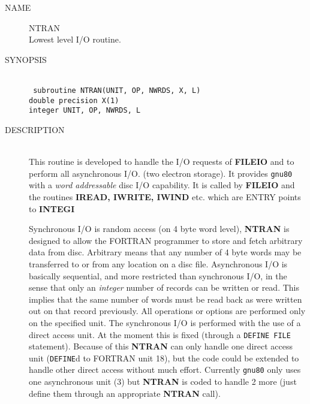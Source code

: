 \newpage
\begin{description}
\item[NAME] NTRAN \\
Lowest level I/O routine.
\item[SYNOPSIS] \ \\
{\tt
   subroutine NTRAN(UNIT, OP, NWRDS, X, L) \\
   double precision X(1) \\
   integer UNIT, OP, NWRDS, L \\
}
\item[DESCRIPTION] \ \\
This routine is developed to handle the I/O requests of {\bf FILEIO} and
to perform all asynchronous I/O. (two electron storage).  It provides
{\tt gnu80} with a {\em word addressable} disc I/O capability.  It is called
by {\bf FILEIO} and the routines {\bf IREAD, IWRITE, IWIND} etc. 
which are ENTRY points to {\bf INTEGI}

\begin{center}
\end{center}

Synchronous I/O is random access (on 4 byte word level),
{\bf NTRAN} is designed to allow the FORTRAN programmer to store and
fetch arbitrary data from disc.  Arbitrary means that any 
number of 4 byte words may be transferred to or from any location
on a disc file.
Asynchronous I/O is basically sequential, and more restricted
than synchronous I/O, in the sense that only an {\em integer} number
of records can be written or read. This implies that 
the same number of words must be read back as were written out on that
record previously.
All operations or options are performed only on the specified
unit.
The synchronous I/O is performed with the use of a direct access unit.
At the moment this is fixed (through a {\tt DEFINE FILE}
statement). Because of this {\bf NTRAN} can only handle one direct access
unit ({\tt DEFINE}d to FORTRAN unit  18), but the code could be extended to
handle other direct access without much effort.  Currently {\tt gnu80}
only uses one asynchronous unit (3) but {\bf NTRAN} is coded to handle 2
more (just define them through an appropriate {\bf NTRAN} call).


\end{description}
